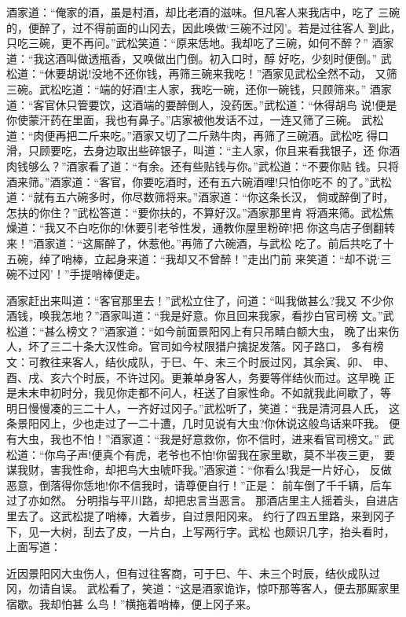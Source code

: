 酒家道：“俺家的酒，虽是村酒，却比老酒的滋味。但凡客人来我店中，吃了
三碗的，便醉了，过不得前面的山冈去，因此唤做‘三碗不过冈’。若是过往客人
到此，只吃三碗，更不再问。”武松笑道：“原来恁地。我却吃了三碗，如何不醉？”
酒家道：“我这酒叫做透瓶香，又唤做出门倒。初入口时，醇好吃，少刻时便倒。”
武松道：“休要胡说!没地不还你钱，再筛三碗来我吃！”酒家见武松全然不动，
又筛三碗。武松吃道：“端的好酒!主人家，我吃一碗，还你一碗钱，只顾筛来。”
酒家道：“客官休只管要饮，这酒端的要醉倒人，没药医。”武松道：“休得胡鸟
说!便是你使蒙汗药在里面，我也有鼻子。”店家被他发话不过，一连又筛了三碗。
武松道：“肉便再把二斤来吃。”酒家又切了二斤熟牛肉，再筛了三碗酒。武松吃
得口滑，只顾要吃，去身边取出些碎银子，叫道：“主人家，你且来看我银子，还
你酒肉钱够么？”酒家看了道：“有余。还有些贴钱与你。”武松道：“不要你贴
钱。只将酒来筛。”酒家道：“客官，你要吃酒时，还有五六碗酒哩!只怕你吃不
的了。”武松道：“就有五六碗多时，你尽数筛将来。”酒家道：“你这条长汉，
倘或醉倒了时，怎扶的你住？”武松答道：“要你扶的，不算好汉。”酒家那里肯
将酒来筛。武松焦燥道：“我又不白吃你的!休要引老爷性发，通教你屋里粉碎!把
你这鸟店子倒翻转来！”酒家道：“这厮醉了，休惹他。”再筛了六碗酒，与武松
吃了。前后共吃了十五碗，绰了哨棒，立起身来道：“我却又不曾醉！”走出门前
来笑道：“却不说‘三碗不过冈’！”手提哨棒便走。

酒家赶出来叫道：“客官那里去！”武松立住了，问道：“叫我做甚么?我又
不少你酒钱，唤我怎地？”酒家叫道：“我是好意。你且回来我家，看抄白官司榜
文。”武松道：“甚么榜文？”酒家道：“如今前面景阳冈上有只吊睛白额大虫，
晚了出来伤人，坏了三二十条大汉性命。官司如今杖限猎户擒捉发落。冈子路口，
多有榜文：可教往来客人，结伙成队，于巳、午、未三个时辰过冈，其余寅、卯、
申、酉、戌、亥六个时辰，不许过冈。更兼单身客人，务要等伴结伙而过。这早晚
正是未末申初时分，我见你走都不问人，枉送了自家性命。不如就我此间歇了，等
明日慢慢凑的三二十人，一齐好过冈子。”武松听了，笑道：“我是清河县人氏，
这条景阳冈上，少也走过了一二十遭，几时见说有大虫?你休说这般鸟话来吓我。
便有大虫，我也不怕！”酒家道：“我是好意救你，你不信时，进来看官司榜文。”
武松道：“你鸟子声!便真个有虎，老爷也不怕!你留我在家里歇，莫不半夜三更，
要谋我财，害我性命，却把鸟大虫唬吓我。”酒家道：“你看么!我是一片好心，
反做恶意，倒落得你恁地!你不信我时，请尊便自行！”正是：
前车倒了千千辆，后车过了亦如然。
分明指与平川路，却把忠言当恶言。
那酒店里主人摇着头，自进店里去了。这武松提了哨棒，大着步，自过景阳冈来。
约行了四五里路，来到冈子下，见一大树，刮去了皮，一片白，上写两行字。武松
也颇识几字，抬头看时，上面写道：

近因景阳冈大虫伤人，但有过往客商，可于巳、午、未三个时辰，结伙成队过
冈，勿请自误。
武松看了，笑道：“这是酒家诡诈，惊吓那等客人，便去那厮家里宿歇。我却怕甚
么鸟！”横拖着哨棒，便上冈子来。

